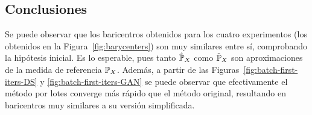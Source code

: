 
\subsection{Conclusiones}\label{ssec:sgdw-conclusiones}  %

Se puede observar que los baricentros obtenidos para los cuatro experimentos (los obtenidos en la Figura~\ref{fig:barycenters}) son muy similares entre sí, comprobando la hipótesis inicial. Es lo esperable, pues tanto $\hat\Prob_X$ como $\tilde\Prob_X$ son aproximaciones de la medida de referencia $\Prob_X$.  Además, a partir de las Figuras~\ref{fig:batch-first-iters-DS} y \ref{fig:batch-first-iters-GAN} se puede observar que efectivamente el método por lotes converge más rápido que el método original, resultando en baricentros muy similares a su versión simplificada.
